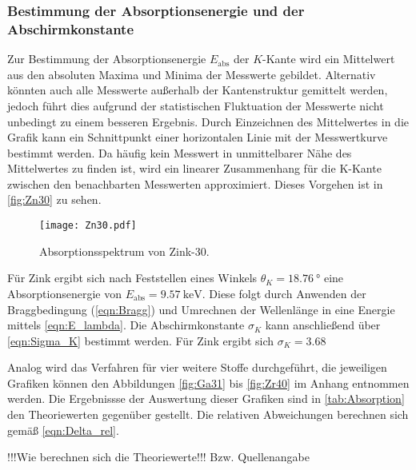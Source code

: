 \subsubsection{Bestimmung der Absorptionsenergie und der Abschirmkonstante}
Zur Bestimmung der Absorptionsenergie $E_\text{abs}$ der $K$-Kante wird ein Mittelwert aus den absoluten Maxima und Minima der Messwerte gebildet.
Alternativ könnten auch alle Messwerte außerhalb der Kantenstruktur gemittelt werden, jedoch führt dies aufgrund der statistischen Fluktuation der Messwerte nicht
unbedingt zu einem besseren Ergebnis. Durch Einzeichnen des Mittelwertes in die Grafik kann ein Schnittpunkt einer horizontalen Linie mit der Messwertkurve bestimmt werden.
Da häufig kein Messwert in unmittelbarer Nähe des Mittelwertes zu finden ist, wird ein linearer Zusammenhang für die K-Kante zwischen den benachbarten Messwerten
approximiert. Dieses Vorgehen ist in \autoref{fig:Zn30} zu sehen.

\begin{figure}
  \centering
  \texttt{[image: Zn30.pdf]}
  \caption{Absorptionsspektrum von Zink-30.}
  \label{fig:Zn30}
\end{figure}

Für Zink ergibt sich nach Feststellen eines Winkels $\theta_K = \qty{18.76}{\degree}$ eine Absorptionsenergie von $E_\text{abs} = \qty{9.57}{\kilo\electronvolt}$.
Diese folgt durch Anwenden der Braggbedingung (\autoref{eqn:Bragg}) und Umrechnen der Wellenlänge in eine Energie mittels \autoref{eqn:E_lambda}.
Die Abschirmkonstante $\sigma_K$ kann anschließend über \autoref{eqn:Sigma_K} bestimmt werden. 
Für Zink ergibt sich $\sigma_K = 3.68$

Analog wird das Verfahren für vier weitere Stoffe durchgeführt, die jeweiligen Grafiken können den Abbildungen \ref{fig:Ga31} bis \ref{fig:Zr40} im Anhang 
entnommen werden.  Die Ergebnissse der Auswertung dieser Grafiken sind in \autoref{tab:Absorption} den Theoriewerten gegenüber gestellt.
Die relativen Abweichungen berechnen sich gemäß \autoref{eqn:Delta_rel}.

!!!Wie berechnen sich die Theoriewerte!!! Bzw. Quellenangabe


